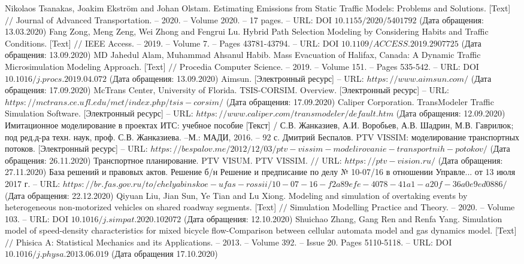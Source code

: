 \begin{thebibliography}{00}
	Nikolaos Tsanakas, Joakim Ekström and Johan Olstam. Estimating Emissions from Static Traffic Models: Problems and Solutions. [Text] $//$ Journal of Advanced Transportation. -- 2020. -- Volume 2020. -- 17 pages. -- URL: DOI $10.1155/2020/5401792$ (Дата обращения: 13.03.2020)
	Fang Zong, Meng Zeng, Wei Zhong and Fengrui Lu. Hybrid Path Selection Modeling by Considering Habits and Traffic Conditions. [Text] $//$ IEEE Access. -- 2019. -- Volume 7. -- Pages 43781-43794. -- URL: DOI $10.1109/ACCESS.2019.2907725$ (Дата обращения: 13.09.2020)
	MD Jahedul Alam, Muhammad Ahsanul Habib. Mass Evacuation of Halifax, Canada: A Dynamic Traffic Microsimulation Modeling Approach. [Text] $//$ Procedia Computer Science. -- 2019. -- Volume 151. -- Pages 535-542. -- URL: DOI $10.1016/j.procs.2019.04.072$ (Дата обращения: 13.09.2020)
	Aimsun. [Электронный ресурс] -- URL: $https://www.aimsun.com/$ (Дата обращения: 17.09.2020)
	McTrans Center, University of Florida. TSIS-CORSIM. Overview. [Электронный ресурс] -- URL: $https://mctrans.ce.ufl.edu/mct/index.php/tsis-corsim/$ (Дата обращения: 17.09.2020)
	Caliper Corporation. TransModeler Traffic Simulation Software. [Электронный ресурс] -- URL: $https://www.caliper.com/transmodeler/default.htm$ (Дата обращения: 12.09.2020)
	Имитационное моделирование в проектах ИТС: учебное пособие [Текст] / С.В. Жанказиев, А.И. Воробьев, А.В. Шадрин, М.В. Гаврилюк; под ред.д-ра техн. наук, проф. С.В. Жанказиева. --М.: МАДИ, 2016. -- 92 с.
	Дмитрий Беспалов. PTV VISSIM: моделирование транспортных потоков. [Электронный ресурс] -- URL: $https://bespalov.me/2012/12/03/ptv-vissim-modelirovanie-transportnih-potokov/$ (Дата обращения: 26.11.2020)
	Транспортное планирование. PTV VISUM. PTV VISSIM. $//$ URL: $https://ptv-vision.ru/$ (Дата обращения: 27.11.2020)
	База решений и правовых актов. Решение б/н Решение и предписание по делу № 10-07/16 в отношении Управле... от 13 июля 2017 г. -- URL: $https://br.fas.gov.ru/to/chelyabinskoe-ufas-rossii/10-07-16-f2a89efe-4078-41a1-a20f-36a0e9ed0886/$ (Дата обращения: 22.12.2020)
	Qiyuan Liu, Jian Sun, Ye Tian and Lu Xiong. Modeling and simulation of overtaking events by heterogeneous non-motorized vehicles on shared roadway segments. [Text] $//$ Simulation Modelling Practice and Theory. -- 2020. -- Volume 103. -- URL: DOI $10.1016/j.simpat.2020.102072$ (Дата обращения: 12.10.2020)
	Shuichao Zhang, Gang Ren and Renfa Yang. Simulation model of speed-density characteristics for mixed bicycle flow-Comparison between cellular automata model and gas dynamics model. [Text] $//$ Phisica A: Statistical Mechanics and its Applications. -- 2013. -- Volume 392. -- Issue 20. Pages 5110-5118. -- URL: DOI $10.1016/j.physa.2013.06.019$ (Дата обращения 17.10.2020)

\end{thebibliography}
